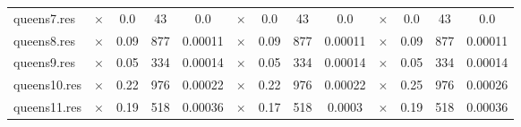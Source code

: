 \documentclass[main.tex]{subfiles}
\begin{document}
\begin{landscape}
\begin{center}
\begin{tabular}{|l|cccc|cccc|cccc|}
queens7.res & $\times$ & 0.0 & 43 & 0.0
 & $\times$ & 0.0 & 43 & 0.0
 & $\times$ & 0.0 & 43 & 0.0
\\
queens8.res & $\times$ & 0.09 & 877 & 0.00011
 & $\times$ & 0.09 & 877 & 0.00011
 & $\times$ & 0.09 & 877 & 0.00011
\\
queens9.res & $\times$ & 0.05 & 334 & 0.00014
 & $\times$ & 0.05 & 334 & 0.00014
 & $\times$ & 0.05 & 334 & 0.00014
\\
queens10.res & $\times$ & 0.22 & 976 & 0.00022
 & $\times$ & 0.22 & 976 & 0.00022
 & $\times$ & 0.25 & 976 & 0.00026
\\
queens11.res & $\times$ & 0.19 & 518 & 0.00036
 & $\times$ & 0.17 & 518 & 0.0003
 & $\times$ & 0.19 & 518 & 0.00036
\\
\hline\end{tabular}
\end{center}
\end{landscape}
\newpage
\end{document}

